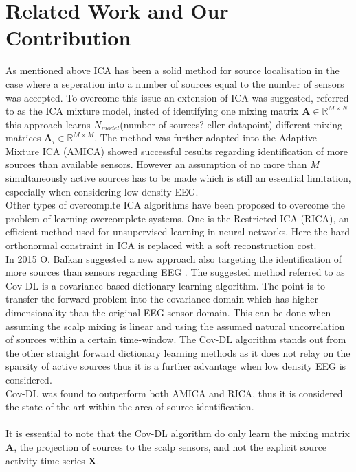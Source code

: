 \section{Related Work and Our Contribution} 
As mentioned above ICA has been a solid method for source localisation in the case where a seperation into a number of sources equal to the number of sensors was accepted. To overcome this issue an extension of ICA was suggested, referred to as the ICA mixture model, insted of identifying one mixing matrix $\mathbf{A}\in \mathbb{R}^{M\times N}$ this approach learns $N_{model}$(number of sources? eller datapoint) different mixing matrices $\mathbf{A}_i\in \mathbb{R}^{M\times M}$. The method was further adapted into the Adaptive Mixture ICA (AMICA) showed successful results regarding identification of more sources than available sensors\cite{Palmer2008}. However an assumption of no more than $M$ simultaneously active sources has to be made which is still an essential limitation, especially when considering low density EEG. \\
Other types of overcomplte ICA algorithms have been proposed to overcome the problem of learning overcomplete systems. One is the Restricted ICA (RICA), an efficient method used for unsupervised learning in neural networks\cite{Le2011}. Here the hard orthonormal constraint in ICA is replaced with a soft reconstruction cost.\\
In 2015 O. Balkan suggested a new approach also targeting the identification of more sources than sensors regarding EEG \cite{Balkan2015}. The suggested method referred to as Cov-DL is a covariance based dictionary learning algorithm. The point is to transfer the forward problem into the covariance domain which has higher dimensionality than the original EEG sensor domain. This can be done when assuming the scalp mixing is linear and using the assumed natural uncorrelation of sources within a certain time-window. The Cov-DL algorithm stands out from the other straight forward dictionary learning methods as it does not relay on the sparsity of active sources thus it is a further advantage when low density EEG is considered. \\
Cov-DL was found to outperform both AMICA and RICA, thus it is considered the state of the art within the area of source identification. \\ \\
It is essential to note that the Cov-DL algorithm do only learn the mixing matrix $\textbf{A}$, the projection of sources to the scalp sensors, and not the explicit source activity time series $\textbf{X}$.\\
